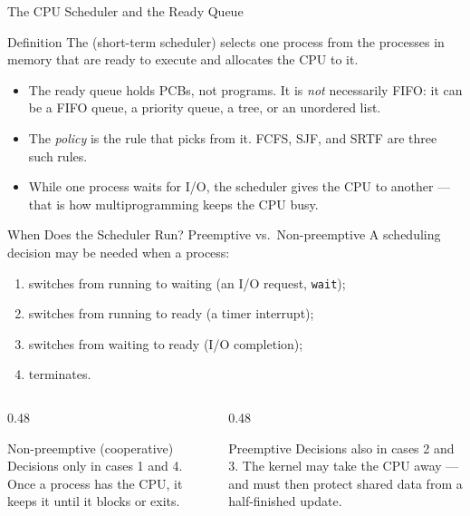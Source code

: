 \documentclass[aspectratio=169]{beamer}
\begin{document}
\begin{frame}{The CPU Scheduler and the Ready Queue}
  \begin{block}{Definition}
    The  (short-term scheduler) selects one process from
    the processes in memory that are ready to execute and allocates the CPU
    to it.
  \end{block}
  \begin{itemize}
    \item The ready queue holds PCBs, not programs. It is \emph{not}
      necessarily FIFO: it can be a FIFO queue, a priority queue, a tree, or
      an unordered list.
    \item The \emph{policy} is the rule that picks from it. FCFS, SJF, and
      SRTF are three such rules.
    \item While one process waits for I/O, the scheduler gives the CPU to
      another --- that is how multiprogramming keeps the CPU busy.
  \end{itemize}
\end{frame}

\begin{frame}{When Does the Scheduler Run? Preemptive vs.\ Non-preemptive}
  \footnotesize
  A scheduling decision may be needed when a process:
  \begin{enumerate}
    \item switches from running to waiting (an I/O request, \texttt{wait});
    \item switches from running to ready (a timer interrupt);
    \item switches from waiting to ready (I/O completion);
    \item terminates.
  \end{enumerate}
  \begin{columns}[T]
    \begin{column}{0.48\textwidth}
      \begin{block}{Non-preemptive (cooperative)}
        Decisions only in cases 1 and 4. Once a process has the CPU, it keeps
        it until it blocks or exits.
      \end{block}
    \end{column}
    \begin{column}{0.48\textwidth}
      \begin{alertblock}{Preemptive}
        Decisions also in cases 2 and 3. The kernel may take the CPU away ---
        and must then protect shared data from a half-finished update.
      \end{alertblock}
    \end{column}
  \end{columns}
\end{frame}
\end{document}
